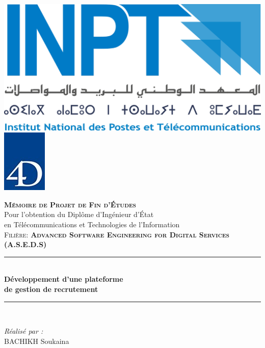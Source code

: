 \begin{titlepage}

\includegraphics[scale=0.11]{Images/logo-inpt.png}
\hspace{10.0cm}
\includegraphics[scale=0.8]{Images/logo-4d.jpg}

\vspace{2cm}


\centering
{\LARGE \textsc{\textbf{Mémoire de Projet de Fin d’Études }}}\\[0.3cm]
{\large Pour l’obtention du Diplôme d’Ingénieur d’État\\ en Télécommunications et Technologies de l’Information }\\[0.3cm]
{ \textsc{Filière: \textbf{Advanced Software Engineering for Digital Services (A.S.E.D.S)} }}\\[0.1cm]
\vspace{1cm}

\rule{\linewidth}{0.4mm} \\[0.6cm] %
{ \huge \textbf{Développement d'une plateforme}\\[0.2cm]\textbf{ de gestion de recrutement 
 }} \\[0.8cm]
\rule{\linewidth}{0.4mm} \\[0.4cm]
\vspace{1cm}
\noindent
\begin{minipage}{0.9\textwidth}
    \vspace{-7mm}
  \begin{flushleft} \large
    \emph{Réalisé par :} \\
    \textsc{BACHIKH} Soukaina  \\
    

\end{flushleft}
\end{minipage}
\end{titlepage}

